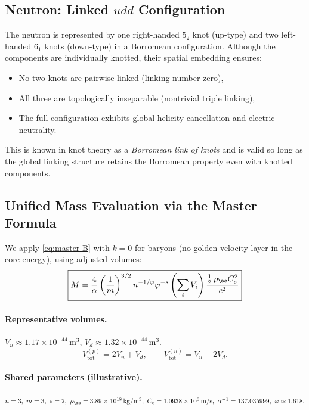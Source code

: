 \documentclass[12pt]{article}
\begin{document}
\subsection{Neutron: Linked \(udd\) Configuration}

The neutron is represented by one right-handed \( 5_2 \) knot (up-type) and two left-handed \( 6_1 \) knots (down-type) in a Borromean configuration. Although the components are individually knotted, their spatial embedding ensures:

\begin{itemize}
    \item No two knots are pairwise linked (linking number zero),
    \item All three are topologically inseparable (nontrivial triple linking),
    \item The full configuration exhibits global helicity cancellation and electric neutrality.
\end{itemize}

This is known in knot theory as a \emph{Borromean link of knots} and is valid so long as the global linking structure retains the Borromean property even with knotted components.

  \subsection{Unified Mass Evaluation via the Master Formula}
  We apply \eqref{eq:master-B} with \(k=0\) for baryons (no golden velocity layer in the core energy), using adjusted volumes:
  \begin{equation}
      \boxed{
          M = \frac{4}{\alpha} \left(\frac{1}{m}\right)^{3/2} n^{-1/\varphi} \varphi^{-s}
          \left(\sum_i V_i\right)
          \frac{\tfrac12\,\rho_{\ae} C_e^2}{c^2}
      }
  \end{equation}

  \paragraph{Representative volumes.}
  \(V_u \approx 1.17\times 10^{-44}\,\mathrm{m}^3\),
  \(V_d \approx 1.32\times 10^{-44}\,\mathrm{m}^3\).
  \[
      V_{\text{tot}}^{(p)}=2V_u+V_d,\qquad
      V_{\text{tot}}^{(n)}=V_u+2V_d.
  \]
  \paragraph{Shared parameters (illustrative).}
  \(n=3,\ m=3,\ s=2,\ \rho_{\ae}=3.89\times10^{18}\,\mathrm{kg/m^3},\
  C_e=1.0938\times10^{6}\,\mathrm{m/s},\
  \alpha^{-1}=137.035999,\ \varphi\simeq1.618.\)
\end{document}
